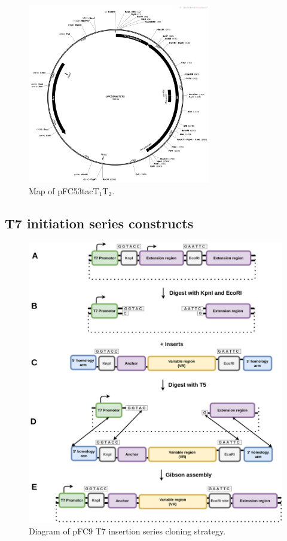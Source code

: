\documentclass[11pt]{article}
\begin{document}
\begin{figure}[H]
	\includegraphics[width=8cm]{images/plasmid_maps/pFC53tacT1T2_Map.png}
	\centering
	\caption{Map of pFC53tacT$_1$T$_2$.}
	\label{fig:map_pFC53tacT1T2}
\end{figure}


\subsection{T7 initiation series constructs}
\label{T7:init} 


\begin{figure}[H]
	\includegraphics[width=15cm]{images/cloning_diagrams/construct_diagrams-T7-Initiation-series.png}
	\centering
	\caption{Diagram of pFC9 T7 insertion series cloning strategy.}
	\label{clone:T7-insert}
\end{figure}
\end{document}
